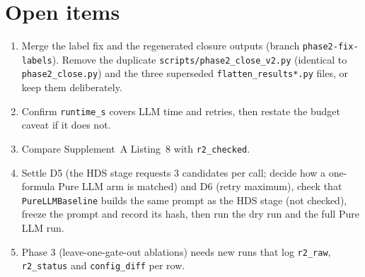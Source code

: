 \documentclass[11pt,a4paper]{article}
\newcommand{\code}[1]{\texttt{#1}}
\begin{document}
\section{Open items}
\begin{enumerate}
\item Merge the label fix and the regenerated closure outputs (branch \code{phase2-fix-labels}). Remove the duplicate \code{scripts/phase2\_close\_v2.py} (identical to \code{phase2\_close.py}) and the three superseded \code{flatten\_results*.py} files, or keep them deliberately.
\item Confirm \code{runtime\_s} covers LLM time and retries, then restate the budget caveat if it does not.
\item Compare Supplement~A Listing~8 with \code{r2\_checked}.
\item Settle D5 (the HDS stage requests 3 candidates per call; decide how a one-formula Pure LLM arm is matched) and D6 (retry maximum), check that \code{PureLLMBaseline} builds the same prompt as the HDS stage (not checked), freeze the prompt and record its hash, then run the dry run and the full Pure LLM run.
\item Phase 3 (leave-one-gate-out ablations) needs new runs that log \code{r2\_raw}, \code{r2\_status} and \code{config\_diff} per row.
\end{enumerate}
\end{document}
